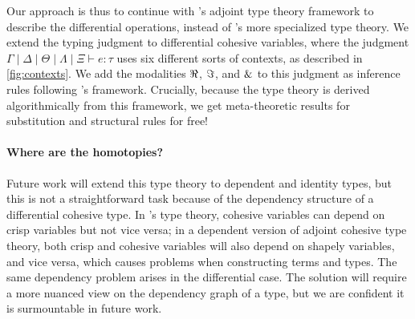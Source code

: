 \documentclass{article}
\begin{document}
Our approach is thus to continue with \citet{Licata2017}'s adjoint type theory
framework to describe the differential operations, instead of
\citet{Shulman2015}'s more specialized type theory. We extend the typing
judgment to differential cohesive variables, where the judgment
$\Gamma \mid \Delta \mid \Theta \mid \Lambda \mid \Xi \vdash e : \tau$ uses six
different sorts of contexts, as described in \cref{fig:contexts}. We add the
modalities $\Re$, $\Im$, and $\&$ to this judgment as inference rules
following \citeauthor{Licata2017}'s framework. Crucially, because the type
theory is derived algorithmically from this framework, we get
meta-theoretic results for substitution and structural rules for free!





\paragraph{Where are the homotopies?}
Future work will extend this type theory to dependent and identity types, but
this is not a straightforward task because of the dependency structure of a
differential cohesive type. In \citet{Shulman2015}'s type theory, cohesive
variables can depend on crisp variables but not vice versa; in a dependent
version of adjoint cohesive type theory, both crisp and cohesive variables will
also depend on shapely variables, and vice versa, which causes problems when
constructing terms and types. The same dependency problem
arises in the differential case. The solution will require a
more nuanced view on the dependency graph of a type, but we are confident it is
surmountable in future work.



\end{document}

